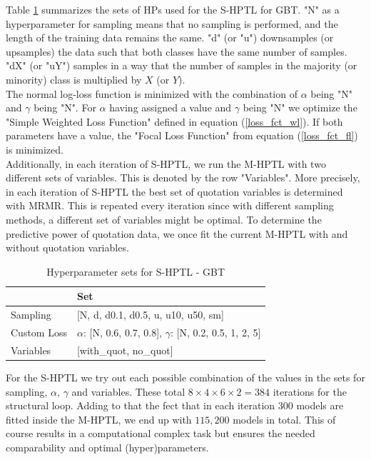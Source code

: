 \documentclass[12pt,titlepage]{article}
\begin{document}
Table \ref{shplgbm} summarizes the sets of HPs used for the S-HPTL for GBT. "N" as a hyperparameter for sampling means that no sampling is performed, and the length of the training data remains the same. "d" (or "u") downsamples (or upsamples) the data such that both classes have the same number of samples. "dX" (or "uY") samples in a way that the number of samples in the majority (or minority) class is multiplied by $X$ (or $Y$). \\
The normal log-loss function is minimized with the combination of $\alpha$ being "N" and $\gamma$ being "N". For $\alpha$ having assigned a value and $\gamma$ being "N" we optimize the "Simple Weighted Loss Function" defined in equation (\ref{loss_fct_wl}). If both parameters have a value, the "Focal Loss Function" from equation (\ref{loss_fct_fl}) is minimized. \\
Additionally, in each iteration of S-HPTL, we run the M-HPTL with two different sets of variables. This is denoted by the row "Variables". More precisely, in each iteration of S-HPTL the best set of quotation variables is determined with MRMR. This is repeated every iteration since with different sampling methods, a different set of variables might be optimal. To determine the predictive power of quotation data, we once fit the current M-HPTL with and without quotation variables. \\
\begin{table}[H]
    \centering
    \begin{tabular}{|l|l|}
    \hline
              & Set  \\
    \hline
    Sampling &  [N, d, d0.1, d0.5, u, u10, u50, sm]  \\
    Custom Loss & $\alpha$: [N, 0.6, 0.7, 0.8], $\gamma$: [N, 0.2, 0.5, 1, 2, 5] \\
    Variables & [with\_quot, no\_quot] \\
    \hline
    \end{tabular}
    \caption{Hyperparameter sets for S-HPTL - GBT}
    \label{shplgbm}
\end{table}
\noindent
For the S-HPTL we try out each possible combination of the values in the sets for sampling, $\alpha$, $\gamma$ and variables. These total $8\times4\times6\times2=384$ iterations for the structural loop. Adding to that the fect that in each iteration 300 models are fitted inside the M-HPTL, we end up with $115,200$ models in total. This of course results in a computational complex task but ensures the needed comparability and optimal (hyper)parameters. \\
\end{document}
